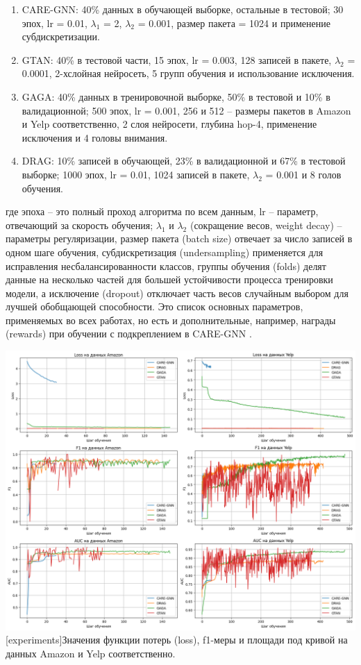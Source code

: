\begin{enumerate}
    \item CARE-GNN: 40\% данных в обучающей выборке, остальные в тестовой; 30 эпох, lr = 0.01, \(\lambda_1\) = 2, \(\lambda_2\) = 0.001, размер пакета = 1024 и применение субдискретизации.

    \item GTAN: 40\% в тестовой части, 15 эпох, lr = 0.003, 128 записей в пакете, \(\lambda_2\) = 0.0001, 2-хслойная нейросеть, 5 групп обучения и использование исключения.

    \item GAGA: 40\% данных в тренировочной выборке, 50\% в тестовой и 10\% в валидационной; 500 эпох, lr = 0.001, 256 и 512 -- размеры пакетов в Amazon и Yelp соответственно, 2 слоя нейросети, глубина hop-4, применение исключения и 4 головы внимания.

    \item DRAG: 10\% записей в обучающей, 23\% в валидационной и 67\% в тестовой выборке; 1000 эпох, lr = 0.01, 1024 записей в пакете, \(\lambda_2\) = 0.001 и 8 голов обучения.
\end{enumerate}
где эпоха -- это полный проход алгоритма по всем данным, lr -- параметр, отвечающий за скорость обучения; \(\lambda_1\) и \(\lambda_2\) (сокращение весов, weight decay) -- параметры регуляризации, размер пакета (batch size) отвечает за число записей в одном шаге обучения, субдискретизация (undersampling) применяется для исправления несбалансированности классов, группы обучения (folds) делят данные на несколько частей для большей устойчивости процесса тренировки модели, а исключение (dropout) отключает часть весов случайным выбором для лучшей обобщающей способности. Это список основных параметров, применяемых во всех работах, но есть и дополнительные, например, награды (rewards) при обучении с подкреплением в CARE-GNN \cite{dou2020}.

{
    \centering
    \includegraphics[width=1.05\linewidth]{images/experiments.png}
    [experiments]{Значения функции потерь (loss), f1-меры и площади под кривой на данных Amazon и Yelp соответственно.}
    \label{experiments}
}

